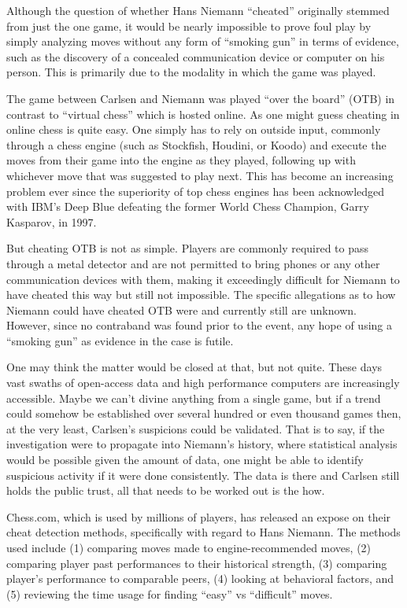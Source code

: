 \documentclass[12pt, letterpaper, titlepage]{article}
\begin{document}
Although the question of whether Hans Niemann “cheated” originally stemmed from just the one game, it would be nearly impossible to prove foul play by simply analyzing moves without any form of “smoking gun” in terms of evidence, such as the discovery of a concealed communication device or computer on his person. This is primarily due to the modality in which the game was played.

The game between Carlsen and Niemann was played “over the board” (OTB) in contrast to “virtual chess” which is hosted online. As one might guess cheating in online chess is quite easy. One simply has to rely on outside input, commonly through a chess engine (such as Stockfish, Houdini, or Koodo) and execute the moves from their game into the engine as they played, following up with whichever move that was suggested to play next. This has become an increasing problem ever since the superiority of top chess engines has been acknowledged with IBM's Deep Blue defeating the former World Chess Champion, Garry Kasparov, in 1997.

But cheating OTB is not as simple. Players are commonly required to pass through a metal detector and are not permitted to bring phones or any other communication devices with them, making it exceedingly difficult for Niemann to have cheated this way but still not impossible. The specific allegations as to how Niemann could have cheated OTB were and currently still are unknown. However, since no contraband was found prior to the event, any hope of using a “smoking gun” as evidence in the case is futile.

One may think the matter would be closed at that, but not quite. These days vast swaths of open-access data and high performance computers are increasingly accessible. Maybe we can't divine anything from a single game, but if a trend could somehow be established over several hundred or even thousand games then, at the very least, Carlsen's suspicions could be validated. That is to say, if the investigation were to propagate into Niemann's history, where statistical analysis would be possible given the amount of data, one might be able to identify suspicious activity if it were done consistently. The data is there and Carlsen still holds the public trust, all that needs to be worked out is the how.

Chess.com, which is used by millions of players, has released an expose on their cheat detection methods, specifically with regard to Hans Niemann. The methods used include (1) comparing moves made to engine-recommended moves, (2) comparing player past performances to their historical strength, (3) comparing player's performance to comparable peers, (4) looking at behavioral factors, and (5) reviewing the time usage for finding “easy” vs “difficult” moves.
\end{document}
